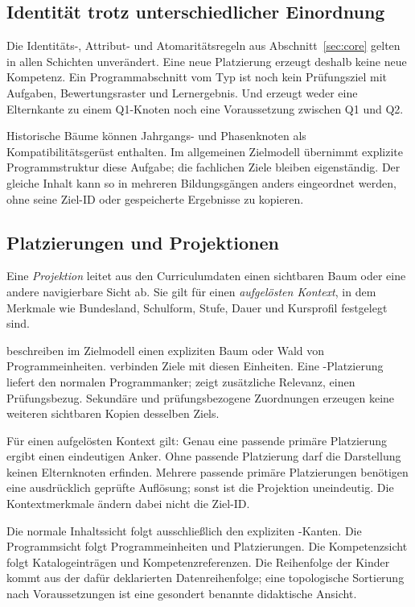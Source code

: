 \subsection{Identität trotz unterschiedlicher Einordnung}

Die Identitäts-, Attribut- und Atomaritätsregeln aus
Abschnitt~\ref{sec:core} gelten in allen Schichten unverändert.
Eine neue Platzierung erzeugt deshalb keine neue Kompetenz.
Ein Programmabschnitt vom Typ  ist noch kein
Prüfungsziel mit Aufgaben, Bewertungsraster und Lernergebnis.
Und  erzeugt weder eine Elternkante zu einem
Q1-Knoten noch eine Voraussetzung zwischen Q1 und Q2.

Historische Bäume können Jahrgangs- und Phasenknoten als
Kompatibilitätsgerüst enthalten. Im allgemeinen Zielmodell
übernimmt explizite Programmstruktur diese Aufgabe; die
fachlichen Ziele bleiben eigenständig. Der gleiche Inhalt
kann so in mehreren Bildungsgängen anders eingeordnet werden,
ohne seine Ziel-ID oder gespeicherte Ergebnisse zu kopieren.

\subsection{Platzierungen und Projektionen}

Eine \emph{Projektion} leitet aus den Curriculumdaten einen sichtbaren Baum
oder eine andere navigierbare Sicht ab. Sie gilt für einen
\emph{aufgelösten Kontext}, in dem Merkmale wie Bundesland, Schulform,
Stufe, Dauer und Kursprofil festgelegt sind.

 beschreiben im Zielmodell einen expliziten Baum oder
Wald von Programmeinheiten.  verbinden Ziele mit
diesen Einheiten. Eine -Platzierung liefert den normalen
Programmanker;  zeigt zusätzliche Relevanz,
 einen Prüfungsbezug. Sekundäre und prüfungsbezogene
Zuordnungen erzeugen keine weiteren sichtbaren Kopien desselben Ziels.

Für einen aufgelösten Kontext gilt: Genau eine passende primäre
Platzierung ergibt einen eindeutigen Anker. Ohne passende Platzierung
darf die Darstellung keinen Elternknoten erfinden. Mehrere passende
primäre Platzierungen benötigen eine ausdrücklich geprüfte Auflösung;
sonst ist die Projektion uneindeutig. Die Kontextmerkmale ändern dabei
nicht die Ziel-ID.

Die normale Inhaltssicht folgt ausschließlich den expliziten
-Kanten. Die Programmsicht folgt Programmeinheiten und
Platzierungen. Die Kompetenzsicht folgt Katalogeinträgen und
Kompetenzreferenzen. Die Reihenfolge der Kinder kommt aus der dafür
deklarierten Datenreihenfolge; eine topologische Sortierung nach
Voraussetzungen ist eine gesondert benannte didaktische Ansicht.

